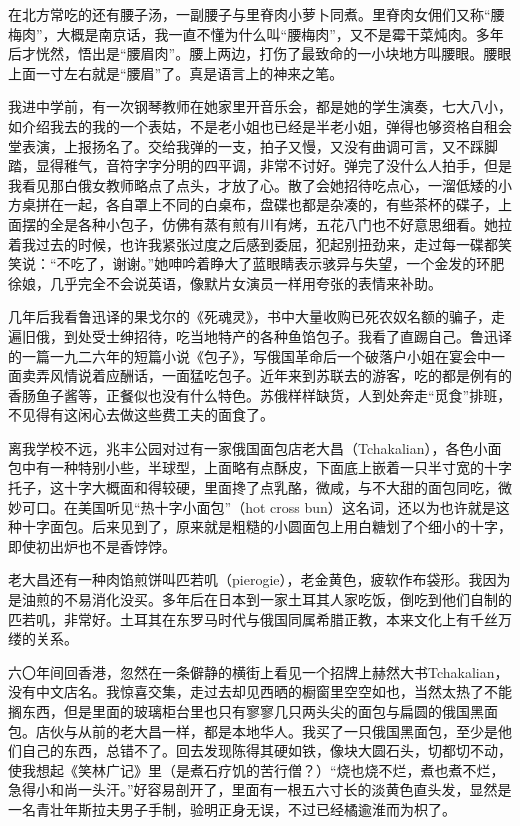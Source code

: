\par 在北方常吃的还有腰子汤，一副腰子与里脊肉小萝卜同煮。里脊肉女佣们又称“腰梅肉”，大概是南京话，我一直不懂为什么叫“腰梅肉”，又不是霉干菜炖肉。多年后才恍然，悟出是“腰眉肉”。腰上两边，打伤了最致命的一小块地方叫腰眼。腰眼上面一寸左右就是“腰眉”了。真是语言上的神来之笔。
\par 我进中学前，有一次钢琴教师在她家里开音乐会，都是她的学生演奏，七大八小，如介绍我去的我的一个表姑，不是老小姐也已经是半老小姐，弹得也够资格自租会堂表演，上报扬名了。交给我弹的一支，拍子又慢，又没有曲调可言，又不踩脚踏，显得稚气，音符字字分明的四平调，非常不讨好。弹完了没什么人拍手，但是我看见那白俄女教师略点了点头，才放了心。散了会她招待吃点心，一溜低矮的小方桌拼在一起，各自罩上不同的白桌布，盘碟也都是杂凑的，有些茶杯的碟子，上面摆的全是各种小包子，仿佛有蒸有煎有川有烤，五花八门也不好意思细看。她拉着我过去的时候，也许我紧张过度之后感到委屈，犯起别扭劲来，走过每一碟都笑笑说：“不吃了，谢谢。”她呻吟着睁大了蓝眼睛表示骇异与失望，一个金发的环肥徐娘，几乎完全不会说英语，像默片女演员一样用夸张的表情来补助。
\par 几年后我看鲁迅译的果戈尔的《死魂灵》，书中大量收购已死农奴名额的骗子，走遍旧俄，到处受士绅招待，吃当地特产的各种鱼馅包子。我看了直踢自己。鲁迅译的一篇一九二六年的短篇小说《包子》，写俄国革命后一个破落户小姐在宴会中一面卖弄风情说着应酬话，一面猛吃包子。近年来到苏联去的游客，吃的都是例有的香肠鱼子酱等，正餐似也没有什么特色。苏俄样样缺货，人到处奔走“觅食”排班，不见得有这闲心去做这些费工夫的面食了。
\par 离我学校不远，兆丰公园对过有一家俄国面包店老大昌（Tchakalian），各色小面包中有一种特别小些，半球型，上面略有点酥皮，下面底上嵌着一只半寸宽的十字托子，这十字大概面和得较硬，里面搀了点乳酪，微咸，与不大甜的面包同吃，微妙可口。在美国听见“热十字小面包”（hot cross bun）这名词，还以为也许就是这种十字面包。后来见到了，原来就是粗糙的小圆面包上用白糖划了个细小的十字，即使初出炉也不是香饽饽。
\par 老大昌还有一种肉馅煎饼叫匹若叽（pierogie），老金黄色，疲软作布袋形。我因为是油煎的不易消化没买。多年后在日本到一家土耳其人家吃饭，倒吃到他们自制的匹若叽，非常好。土耳其在东罗马时代与俄国同属希腊正教，本来文化上有千丝万缕的关系。
\par 六〇年间回香港，忽然在一条僻静的横街上看见一个招牌上赫然大书Tchakalian，没有中文店名。我惊喜交集，走过去却见西晒的橱窗里空空如也，当然太热了不能搁东西，但是里面的玻璃柜台里也只有寥寥几只两头尖的面包与扁圆的俄国黑面包。店伙与从前的老大昌一样，都是本地华人。我买了一只俄国黑面包，至少是他们自己的东西，总错不了。回去发现陈得其硬如铁，像块大圆石头，切都切不动，使我想起《笑林广记》里（是煮石疗饥的苦行僧？）“烧也烧不烂，煮也煮不烂，急得小和尚一头汗。”好容易剖开了，里面有一根五六寸长的淡黄色直头发，显然是一名青壮年斯拉夫男子手制，验明正身无误，不过已经橘逾淮而为枳了。
